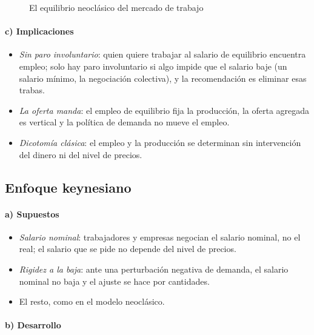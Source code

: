 \documentclass[11pt]{article}
\begin{document}
\begin{figure}[H]
\centering
\caption{El equilibrio neoclásico del mercado de trabajo}\label{fig:equilibrio-trabajo}
\end{figure}

\paragraph{c) Implicaciones}

\begin{itemize}
\item \emph{Sin paro involuntario}: quien quiere trabajar al salario de equilibrio encuentra empleo; solo hay paro involuntario si algo impide que el salario baje (un salario mínimo, la negociación colectiva), y la recomendación es eliminar esas trabas.
\item \emph{La oferta manda}: el empleo de equilibrio fija la producción, la oferta agregada es vertical y la política de demanda no mueve el empleo.
\item \emph{Dicotomía clásica}: el empleo y la producción se determinan sin intervención del dinero ni del nivel de precios.
\end{itemize}

\subsection{Enfoque keynesiano}\label{anexo:debate-keynesiano}

\paragraph{a) Supuestos}

\begin{itemize}
\item \emph{Salario nominal}: trabajadores y empresas negocian el salario nominal, no el real; el salario que se pide no depende del nivel de precios.
\item \emph{Rigidez a la baja}: ante una perturbación negativa de demanda, el salario nominal no baja y el ajuste se hace por cantidades.
\item El resto, como en el modelo neoclásico.
\end{itemize}

\paragraph{b) Desarrollo}
\end{document}
